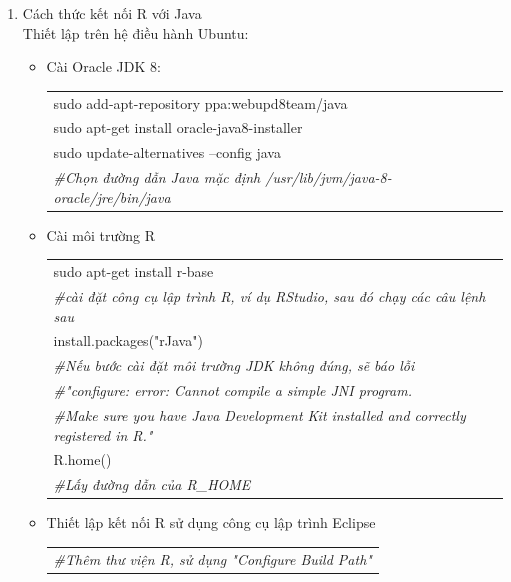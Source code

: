 \documentclass[a4paper, 13pt]{report}
\begin{document}
\begin{enumerate}[label=\textbf{PL\arabic*}]
\item Cách thức kết nối R với Java\\
Thiết lập trên hệ điều hành Ubuntu:
\begin{itemize}
\item Cài Oracle JDK 8:\\
\begin{flushleft}
\begin{tabular}{  |l| }
\hline 
\hspace{.1cm} sudo add-apt-repository ppa:webupd8team/java\\
\hspace{.1cm} sudo apt-get install oracle-java8-installer\\
\hspace{.1cm} sudo update-alternatives --config java\\
\textit{\#Chọn đường dẫn Java mặc định /usr/lib/jvm/java-8-oracle/jre/bin/java}\\
\hline
\end{tabular}
\end{flushleft}
\item Cài môi trường R\\
\begin{flushleft}
\begin{tabular}{  |l| }
\hline 
\hspace{.1cm} sudo apt-get install r-base\\
\textit{\#cài đặt công cụ lập trình R, ví dụ RStudio, sau đó chạy các câu lệnh sau}\\
\hspace{.1cm} install.packages("rJava")\\
\textit{\#Nếu bước cài đặt môi trường JDK không đúng, sẽ báo lỗi}\\
\textit{\#"configure: error: Cannot compile a simple JNI program.}\\
\textit{\#Make sure you have Java Development Kit installed and correctly registered in R."}\\
\hspace{.1cm} R.home()\\ 
\textit{\#Lấy đường dẫn của R\_HOME}\\
\hline
\end{tabular}
\end{flushleft}
\item Thiết lập kết nối R sử dụng công cụ lập trình Eclipse
\begin{flushleft}
\begin{tabular}{  |l| }
\hline 
\textit{\#Thêm thư viện R, sử dụng "Configure Build Path"}\\

\end{tabular}
\end{flushleft}
\end{itemize}
\end{enumerate}
\end{document}
